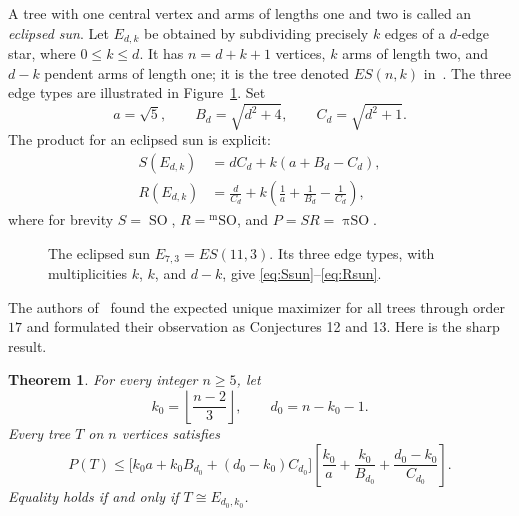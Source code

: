 \documentclass[11pt,a4paper]{article}
\numberwithin{equation}{section}
\newtheorem{theorem}{Theorem}[section]
\newcommand{\somb}{\operatorname{SO}}
\newcommand{\msomb}{\operatorname{{}^m SO}}
\newcommand{\prodso}{\operatorname{\pi SO}}
\newcommand{\floor}[1]{\left\lfloor #1\right\rfloor}
\begin{document}
A tree with one central vertex and arms of lengths one and two is called an \emph{eclipsed sun}. Let $E_{d,k}$ be obtained by subdividing precisely $k$ edges of a $d$-edge star, where $0\le k\le d$. It has $n=d+k+1$ vertices, $k$ arms of length two, and $d-k$ pendent arms of length one; it is the tree denoted $ES(n,k)$ in~\cite{GRF2023}. The three edge types are illustrated in Figure~\ref{fig:sun}. Set
\begin{equation}\label{eq:constants}
a=\sqrt5,\qquad B_d=\sqrt{d^2+4},\qquad C_d=\sqrt{d^2+1}.
\end{equation}
The product for an eclipsed sun is explicit:
\begin{align}
S(E_{d,k})&=dC_d+k(a+B_d-C_d),\label{eq:Ssun}\\
R(E_{d,k})&=\frac{d}{C_d}+k\left(\frac1a+\frac1{B_d}-\frac1{C_d}\right),\label{eq:Rsun}
\end{align}
where for brevity $S=\somb$, $R=\msomb$, and $P=SR=\prodso$.

\begin{figure}[htbp]
\centering
{}
\caption{The eclipsed sun $E_{7,3}=ES(11,3)$. Its three edge types, with multiplicities $k$, $k$, and $d-k$, give \eqref{eq:Ssun}--\eqref{eq:Rsun}.}
\label{fig:sun}
\end{figure}

The authors of~\cite{GRF2023} found the expected unique maximizer for all trees through order $17$ and formulated their observation as Conjectures 12 and 13. Here is the sharp result.
\begin{theorem}\label{thm:main}
For every integer $n\ge5$, let
\[
k_0=\floor{\frac{n-2}{3}},\qquad d_0=n-k_0-1.
\]
Every tree $T$ on $n$ vertices satisfies
\begin{equation}\label{eq:main}
P(T)\le
\bigl[k_0a+k_0B_{d_0}+(d_0-k_0)C_{d_0}\bigr]
\left[\frac{k_0}{a}+\frac{k_0}{B_{d_0}}+\frac{d_0-k_0}{C_{d_0}}\right].
\end{equation}
Equality holds if and only if $T\cong E_{d_0,k_0}$.
\end{theorem}
\end{document}
